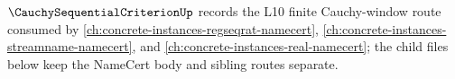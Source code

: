 $\CauchySequentialCriterionUp$ records the L10 finite Cauchy-window route consumed by \autoref{ch:concrete-instances-regseqrat-namecert}, \autoref{ch:concrete-instances-streamname-namecert}, and \autoref{ch:concrete-instances-real-namecert}; the child files below keep the NameCert body and sibling routes separate.


